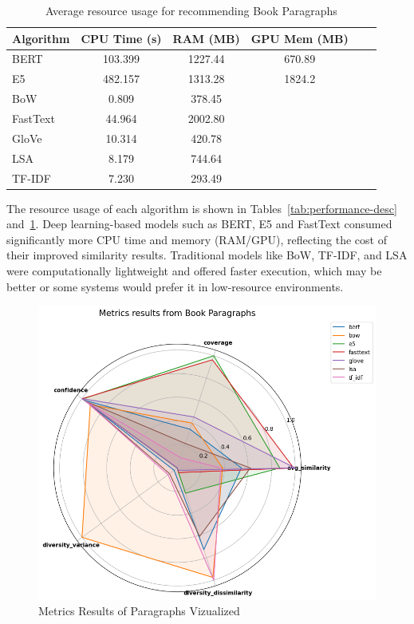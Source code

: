 \documentclass[\myFontSize,a4paper,oneside,hidelinks]{article}
\begin{document}
\begin{table}[H]
\centering
\begin{tabular}{lccccc}

\textbf{Algorithm} & \textbf{CPU Time (s)}  & \textbf{RAM (MB)} & \textbf{GPU Mem (MB)}\\
\hline
BERT     & 103.399 & 1227.44 & 670.89 \\
E5          & 482.157 & 1313.28 & 1824.2 \\
BoW      & 0.809    & 378.45  & \\
FastText & 44.964   & 2002.80 &  \\
GloVe    & 10.314   & 420.78  & \\
LSA      & 8.179    & 744.64  &  \\
TF-IDF   & 7.230  & 293.49  &  \\

\end{tabular}
\caption{Average resource usage for recommending Book Paragraphs}
\label{tab:performance-paragraph}
\end{table}

The resource usage of each algorithm is shown in Tables~\ref{tab:performance-desc} and~\ref{tab:performance-paragraph}. Deep learning-based models such as BERT, E5 and FastText consumed significantly more CPU time and memory (RAM/GPU), reflecting the cost of their improved similarity results. Traditional models like BoW, TF-IDF, and LSA were computationally lightweight and offered faster execution, which may be better or some systems would prefer it in low-resource environments.




\begin{figure}[h!]
    \centering
    \includegraphics[width=\linewidth,keepaspectratio]{img/paragraphs_metrics_radar2.png}
    \caption{Metrics Results of Paragraphs Vizualized}
    \label{fig:paragraphs_radar}
\end{figure}
\end{document}
